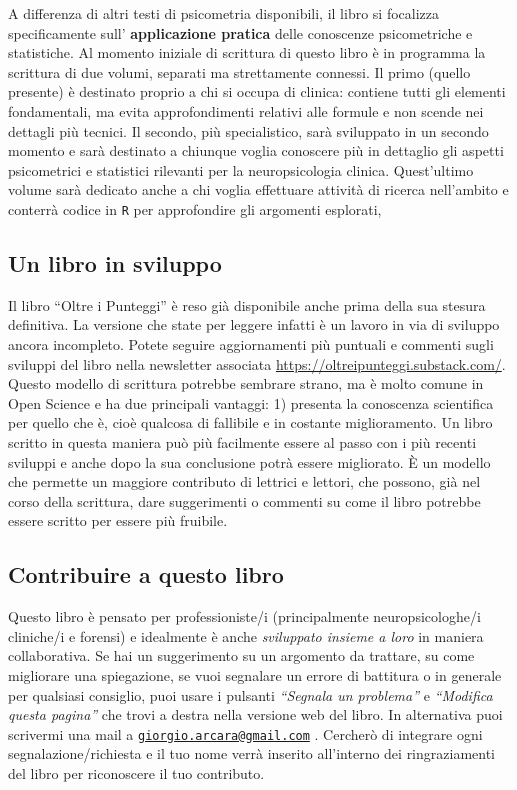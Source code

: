 \documentclass[
  italian,
  letterpaper,
  paper=6in:9in,
  pagesize=pdftex,
  headinclude=on,
  footinclude=on,
  11pt]{scrbook}
\begin{document}
A differenza di altri testi di psicometria disponibili, il libro si
focalizza specificamente sull' \textbf{applicazione pratica} delle
conoscenze psicometriche e statistiche. Al momento iniziale di scrittura
di questo libro è in programma la scrittura di due volumi, separati ma
strettamente connessi. Il primo (quello presente) è destinato proprio a
chi si occupa di clinica: contiene tutti gli elementi fondamentali, ma
evita approfondimenti relativi alle formule e non scende nei dettagli
più tecnici. Il secondo, più specialistico, sarà sviluppato in un
secondo momento e sarà destinato a chiunque voglia conoscere più in
dettaglio gli aspetti psicometrici e statistici rilevanti per la
neuropsicologia clinica. Quest'ultimo volume sarà dedicato anche a chi
voglia effettuare attività di ricerca nell'ambito e conterrà codice in
\texttt{R} per approfondire gli argomenti esplorati,

\subsection*{Un libro in sviluppo}\label{un-libro-in-sviluppo}

Il libro ``Oltre i Punteggi'' è reso già disponibile anche prima della
sua stesura definitiva. La versione che state per leggere infatti è un
lavoro in via di sviluppo ancora incompleto. Potete seguire
aggiornamenti più puntuali e commenti sugli sviluppi del libro nella
newsletter associata \url{https://oltreipunteggi.substack.com/}. Questo
modello di scrittura potrebbe sembrare strano, ma è molto comune in Open
Science e ha due principali vantaggi: 1) presenta la conoscenza
scientifica per quello che è, cioè qualcosa di fallibile e in costante
miglioramento. Un libro scritto in questa maniera può più facilmente
essere al passo con i più recenti sviluppi e anche dopo la sua
conclusione potrà essere migliorato. È un modello che permette un
maggiore contributo di lettrici e lettori, che possono, già nel corso
della scrittura, dare suggerimenti o commenti su come il libro potrebbe
essere scritto per essere più fruibile.

\subsection*{Contribuire a questo
libro}\label{contribuire-a-questo-libro}

Questo libro è pensato per professioniste/i (principalmente
neuropsicologhe/i cliniche/i e forensi) e idealmente è anche
\emph{sviluppato insieme a loro} in maniera collaborativa. Se hai un
suggerimento su un argomento da trattare, su come migliorare una
spiegazione, se vuoi segnalare un errore di battitura o in generale per
qualsiasi consiglio, puoi usare i pulsanti \emph{``Segnala un
problema''} e \emph{``Modifica questa pagina''} che trovi a destra nella
versione web del libro. In alternativa puoi scrivermi una mail a
\href{mailto:giorgio.arcara@gmail.com}{\nolinkurl{giorgio.arcara@gmail.com}}
. Cercherò di integrare ogni segnalazione/richiesta e il tuo nome verrà
inserito all'interno dei ringraziamenti del libro per riconoscere il tuo
contributo.
\end{document}
